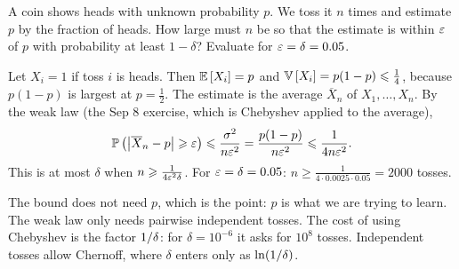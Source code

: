 \begin{exercisebox}
\begin{pproblem}\label{pp:coin}
    A coin shows heads with unknown probability $p$. We toss it $n$ times and estimate $p$ by the
    fraction of heads. How large must $n$ be so that the estimate is within $\varepsilon$ of $p$ with
    probability at least $1 - \delta$? Evaluate for $\varepsilon = \delta = 0.05$.
\end{pproblem}
\tcblower
\begin{wsolution}
    Let $X_i = 1$ if toss $i$ is heads. Then $\operatorname{\mathbb{E}}\left[X_i\right] = p$ and
    $\operatorname{\mathbb{V}}\left[X_i\right] = p(1-p) \leqslant \frac{1}{4}$, because $p(1-p)$ is largest at $p = \frac{1}{2}$. The
    estimate is the average $\overline{X}_n$ of $X_1, \dots, X_n$. By the weak law (the Sep 8
    exercise, which is Chebyshev applied to the average),
    \[\operatorname{\mathbb{P}}\left(\left\lvert\overline{X}_n - p\right\rvert \geqslant \varepsilon\right) \leqslant \frac{\sigma^2}{n\varepsilon^2}
        = \frac{p(1-p)}{n\varepsilon^2} \leqslant \frac{1}{4n\varepsilon^2}.\]
    This is at most $\delta$ when $n \geqslant \frac{1}{4\varepsilon^2\delta}$. For $\varepsilon = \delta = 0.05$:
    $n \geq \frac{1}{4 \cdot 0.0025 \cdot 0.05} = 2000$ tosses.

    The bound does not need $p$, which is the point: $p$ is what we are trying to learn. The weak
    law only needs pairwise independent tosses. The cost of using Chebyshev is the factor
    $1/\delta$: for $\delta = 10^{-6}$ it asks for $10^8$ tosses. Independent tosses allow
    Chernoff, where $\delta$ enters only as $\ln(1/\delta)$.
\end{wsolution}
\end{exercisebox}


